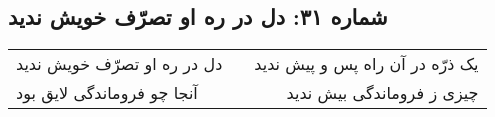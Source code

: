 \begin{center}
\section*{شماره ۳۱: دل در ره او تصرّف خویش ندید}
\label{sec:031}
\begin{longtable}{l p{0.5cm} r}
دل در ره او تصرّف خویش ندید
&&
یک ذرّه در آن راه پس و پیش ندید
\\
آنجا چو فروماندگی لایق بود
&&
چیزی ز فروماندگی بیش ندید
\\
\end{longtable}
\end{center}
